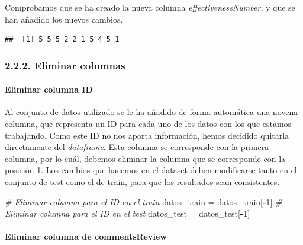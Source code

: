 \documentclass[spanish,]{article}
\newenvironment{Shaded}{\begin{snugshade}}{\end{snugshade}}
\newcommand{\CommentTok}[1]{\textcolor[rgb]{0.56,0.35,0.01}{\textit{#1}}}
\newcommand{\DecValTok}[1]{\textcolor[rgb]{0.00,0.00,0.81}{#1}}
\newcommand{\KeywordTok}[1]{\textcolor[rgb]{0.13,0.29,0.53}{\textbf{#1}}}
\newcommand{\NormalTok}[1]{#1}
\newcommand{\OperatorTok}[1]{\textcolor[rgb]{0.81,0.36,0.00}{\textbf{#1}}}
\newcommand{\StringTok}[1]{\textcolor[rgb]{0.31,0.60,0.02}{#1}}
\let\oldparagraph\paragraph
\renewcommand{\paragraph}[1]{\oldparagraph{#1}\mbox{}}
\begin{document}
Comprobamos que se ha creado la nueva columna
\emph{effectivenessNumber}, y que se han añadido los nuevos cambios.

\begin{Shaded}
\end{Shaded}

\begin{verbatim}
##  [1] 5 5 5 2 2 1 5 4 5 1
\end{verbatim}

\hypertarget{eliminar-columnas}{%
\subsubsection{2.2.2. Eliminar columnas}\label{eliminar-columnas}}

\hypertarget{eliminar-columna-id}{%
\paragraph{Eliminar columna ID}\label{eliminar-columna-id}}

Al conjunto de datos utilizado se le ha añadido de forma automática una
novena columna, que representa un ID para cada uno de los datos con los
que estamos trabajando. Como este ID no nos aporta información, hemos
decidido quitarla directamente del \emph{dataframe}. Esta columna se
corresponde con la primera columna, por lo cuál, debemos eliminar la
columna que se corresponde con la posición 1. Los cambios que hacemos en
el dataset deben modificarse tanto en el conjunto de test como el de
train, para que los resultados sean consistentes.

\begin{Shaded}
\begin{Highlighting}[]
\CommentTok{# Eliminar columna para el ID en el train}
\NormalTok{datos_train =}\StringTok{ }\NormalTok{datos_train[}\OperatorTok{-}\DecValTok{1}\NormalTok{]}
\CommentTok{# Eliminar columna para el ID en el test}
\NormalTok{datos_test =}\StringTok{ }\NormalTok{datos_test[}\OperatorTok{-}\DecValTok{1}\NormalTok{]}
\end{Highlighting}
\end{Shaded}

\hypertarget{eliminar-columna-de-commentsreview}{%
\paragraph{Eliminar columna de
commentsReview}\label{eliminar-columna-de-commentsreview}}
\end{document}
